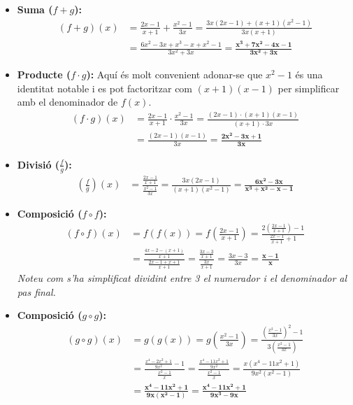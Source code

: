 \documentclass[12pt,a4paper]{article}
\begin{document}
\begin{itemize}[leftmargin=*]
    \item \textbf{Suma ($f + g$):}
    \begin{align*}
    (f + g)(x) &= \frac{2x - 1}{x + 1} + \frac{x^2 - 1}{3x} = \frac{3x(2x - 1) + (x + 1)(x^2 - 1)}{3x(x + 1)} \\
    &= \frac{6x^2 - 3x + x^3 - x + x^2 - 1}{3x^2 + 3x} = \mathbf{\frac{x^3 + 7x^2 - 4x - 1}{3x^2 + 3x}}
    \end{align*}

    \item \textbf{Producte ($f \cdot g$):}
    Aquí és molt convenient adonar-se que $x^2 - 1$ és una identitat notable i es pot factoritzar com $(x+1)(x-1)$ per simplificar amb el denominador de $f(x)$.
    \begin{align*}
    (f \cdot g)(x) &= \frac{2x - 1}{x + 1} \cdot \frac{x^2 - 1}{3x} = \frac{(2x - 1) \cdot (x + 1)(x - 1)}{(x + 1) \cdot 3x} \\
    &= \frac{(2x - 1)(x - 1)}{3x} = \mathbf{\frac{2x^2 - 3x + 1}{3x}}
    \end{align*}

    \item \textbf{Divisió ($\frac{f}{g}$):}
    \begin{align*}
    \left(\frac{f}{g}\right)(x) &= \frac{\frac{2x - 1}{x + 1}}{\frac{x^2 - 1}{3x}} = \frac{3x(2x - 1)}{(x + 1)(x^2 - 1)} = \mathbf{\frac{6x^2 - 3x}{x^3 + x^2 - x - 1}}
    \end{align*}

    \item \textbf{Composició ($f \circ f$):}
    \begin{align*}
    (f \circ f)(x) &= f(f(x)) = f\left(\frac{2x - 1}{x + 1}\right) = \frac{2\left(\frac{2x - 1}{x + 1}\right) - 1}{\frac{2x - 1}{x + 1} + 1} \\
    &= \frac{\frac{4x - 2 - (x + 1)}{x + 1}}{\frac{2x - 1 + x + 1}{x + 1}} = \frac{\frac{3x - 3}{x + 1}}{\frac{3x}{x + 1}} = \frac{3x - 3}{3x} = \mathbf{\frac{x - 1}{x}}
    \end{align*}
    \textit{Noteu com s'ha simplificat dividint entre 3 el numerador i el denominador al pas final.}

    \item \textbf{Composició ($g \circ g$):}
    \begin{align*}
    (g \circ g)(x) &= g(g(x)) = g\left(\frac{x^2 - 1}{3x}\right) = \frac{\left(\frac{x^2 - 1}{3x}\right)^2 - 1}{3\left(\frac{x^2 - 1}{3x}\right)} \\
    &= \frac{\frac{x^4 - 2x^2 + 1}{9x^2} - 1}{\frac{x^2 - 1}{x}} = \frac{\frac{x^4 - 11x^2 + 1}{9x^2}}{\frac{x^2 - 1}{x}} = \frac{x(x^4 - 11x^2 + 1)}{9x^2(x^2 - 1)} \\
    &= \mathbf{\frac{x^4 - 11x^2 + 1}{9x(x^2 - 1)}} = \mathbf{\frac{x^4 - 11x^2 + 1}{9x^3 - 9x}}
    \end{align*}


\end{itemize}
\end{document}

